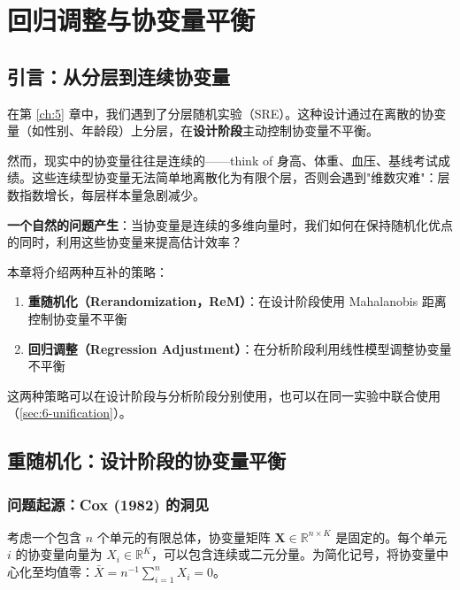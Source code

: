 
\chapter{回归调整与协变量平衡}\label{ch:6}

\section{引言：从分层到连续协变量}\label{sec:6-intro}

在第 \ref{ch:5} 章中，我们遇到了分层随机实验（SRE）。这种设计通过在离散的协变量（如性别、年龄段）上分层，在\textbf{设计阶段}主动控制协变量不平衡。

然而，现实中的协变量往往是连续的——think of 身高、体重、血压、基线考试成绩。这些连续型协变量无法简单地离散化为有限个层，否则会遇到"维数灾难"：层数指数增长，每层样本量急剧减少。

\textbf{一个自然的问题产生}：当协变量是连续的多维向量时，我们如何在保持随机化优点的同时，利用这些协变量来提高估计效率？

本章将介绍两种互补的策略：

\begin{enumerate}
  \item \textbf{重随机化（Rerandomization，ReM）}：在设计阶段使用 Mahalanobis 距离控制协变量不平衡
  \item \textbf{回归调整（Regression Adjustment）}：在分析阶段利用线性模型调整协变量不平衡
\end{enumerate}

这两种策略可以在设计阶段与分析阶段分别使用，也可以在同一实验中联合使用（\cref{sec:6-unification}）。

\section{重随机化：设计阶段的协变量平衡}\label{sec:6-rem}

\subsection{问题起源：Cox (1982) 的洞见}\label{sec:6-rem-origin}

考虑一个包含 $n$ 个单元的有限总体，协变量矩阵 $\mathbf{X} \in \mathbb{R}^{n \times K}$ 是固定的。每个单元 $i$ 的协变量向量为 $X_i \in \mathbb{R}^K$，可以包含连续或二元分量。为简化记号，将协变量中心化至均值零：$\bar{X} = n^{-1}\sum_{i=1}^n X_i = 0$。


